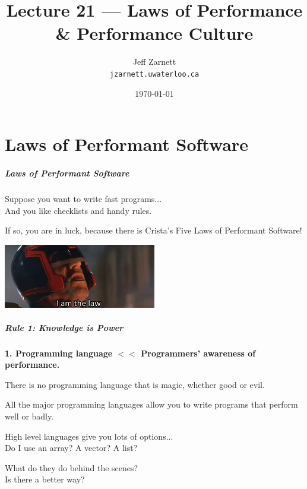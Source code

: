 

\title{Lecture 21 --- Laws of Performance \& Performance Culture }

\author{Jeff Zarnett \\ \small \texttt{jzarnett.uwaterloo.ca}}
\date{\today}




\begin{frame}
  \titlepage

 \end{frame}


\part{Laws of Performant Software}

\begin{frame}
\partpage
\end{frame}


\begin{frame}
\frametitle{Laws of Performant Software}

Suppose you want to write fast programs...\\
\quad And you like checklists and handy rules. 

If so, you are in luck, because there is Crista's Five Laws of Performant Software!

\begin{center}
	\includegraphics[width=0.5\textwidth]{images/thelaw.png}
\end{center}

\end{frame}



\begin{frame}
\frametitle{Rule 1: Knowledge is Power}

\textbf{1. Programming language $<<$ Programmers' awareness of performance.}

There is no programming language that is magic, whether good or evil. 

All the major programming languages allow you to write programs that perform well or badly. 

High level languages give you lots of options...\\
\quad Do I use an array? A vector? A list? 

What do they do behind the scenes?\\
\quad Is there a better way?

\end{frame}



